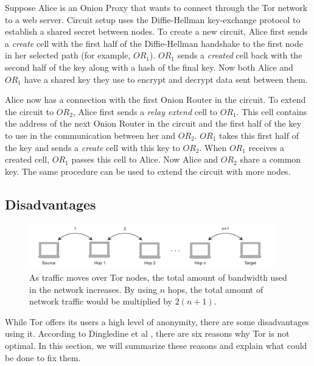 \documentclass{article}
\begin{document}
		Suppose Alice is an Onion Proxy that wants to connect through the Tor network to a web server. Circuit setup uses the Diffie-Hellman key-exchange protocol \cite{diffiehellman} to establish a shared secret between nodes. To create a new circuit, Alice first sends a \emph{create} cell with the first half of the Diffie-Hellman handshake to the first node in her selected path (for example, $ OR_1 $). $ OR_1 $ sends a \emph{created} cell back with the second half of the key along with a hash of the final key. Now both Alice and $ OR_1 $ have a shared key they use to encrypt and decrypt data sent between them.
		
		Alice now has a connection with the first Onion Router in the circuit. To extend the circuit to $ OR_2 $, Alice first sends a \emph{relay extend} cell to $ OR_1 $. This cell contains the address of the next Onion Router in the circuit and the first half of the key to use in the communication between her and $ OR_2 $. $ OR_1 $ takes this first half of the key and sends a \emph{create} cell with this key to $ OR_2 $. When $ OR_1 $ receives a created cell, $ OR_1 $ passes this cell to Alice. Now Alice and $ OR_2 $ share a common key. The same procedure can be used to extend the circuit with more nodes.
			
	\subsection{Disadvantages}
		\label{ss:tor_disadvantages}
		
		\begin{figure}[!t]
			\centering
			\includegraphics[width=0.95\textwidth]{graphics/hops.pdf}
			\caption{As traffic moves over Tor nodes, the total amount of bandwidth used in the network increases. By using $n$ hops, the total amount of network traffic would be multiplied by $2(n+1)$.}
			\label{fig:hops}
		\end{figure}

		While Tor offers its users a high level of anonymity, there are some disadvantages using it. According to Dingledine et al \cite{dingledine2009performance}, there are six reasons why Tor is not optimal. In this section, we will summarize these reasons and explain what could be done to fix them.
		
\end{document}
